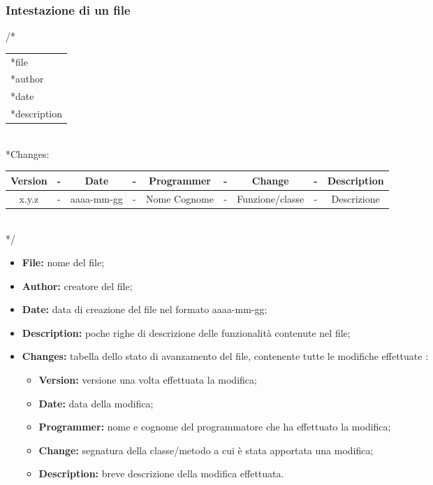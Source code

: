 \newpage
\subsubsection{Intestazione di un file}

\begin{flushleft}

/*\\
\vspace{3mm}
\begin{tabular}{l}
	*file\\
	*author\\
	*date\\
	*description\\
\end{tabular}\\
\vspace{5mm}
 *Changes:\\
 \vspace{3mm}
\begin{tabular}{| c c c c c c c c c |}
	\hline
	Version & - & Date & - & Programmer & - & Change & - & Description\\
	\hline
	x.y.z & - & aaaa-mm-gg & - & Nome Cognome & - & Funzione/classe & - & Descrizione\\
	\hline
\end{tabular}\\
\vspace{3mm}
*/\\

\end{flushleft}

\begin{itemize}
	\item \textbf{File:} nome del file;
	\item \textbf{Author:} creatore del file;
	\item \textbf{Date:} data di creazione del file nel formato aaaa-mm-gg;
	\item \textbf{Description:} poche righe di descrizione delle funzionalità contenute nel file;
	\item \textbf{Changes:} tabella dello stato di avanzamento del file, contenente tutte le modifiche effettuate :
		\begin{itemize}
			\item \textbf{Version:} versione una volta effettuata la modifica;
			\item \textbf{Date:} data della modifica;
			\item \textbf{Programmer:} nome e cognome del programmatore che ha effettuato la modifica;
			\item \textbf{Change:} segnatura della classe/metodo a cui è stata apportata una modifica;
			\item \textbf{Description:} breve descrizione della modifica effettuata.
		\end{itemize}
\end{itemize}

